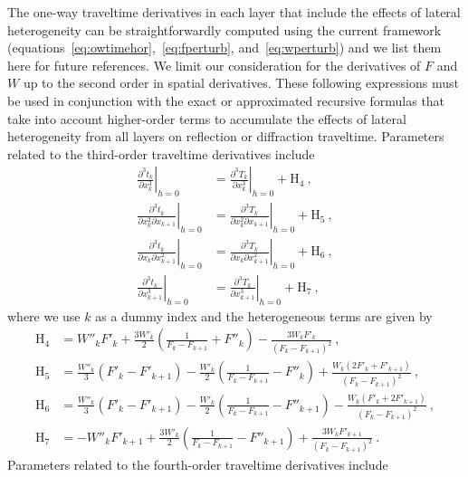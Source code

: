 The one-way traveltime derivatives in each layer that include the effects of lateral heterogeneity can be straightforwardly computed using the current framework (equations~\ref{eq:owtimehor},~\ref{eq:fperturb}, and~\ref{eq:wperturb}) and we list them here for future references. We limit our consideration for the derivatives of $F$ and $W$ up to the second order in spatial derivatives. These following expressions must be used in conjunction with the exact or approximated recursive formulas that take into account higher-order terms to accumulate the effects of lateral heterogeneity from all layers on reflection or diffraction traveltime. Parameters related to the third-order traveltime derivatives include
\begin{align}
\left. \frac{\partial^3 t_k }{\partial x_k^3}\right\rvert_{h=0} & =  \left. \frac{\partial^3 T_k }{\partial x_k^3}\right\rvert_{h=0} + \text{H}_4~,\\
\nonumber
\left. \frac{\partial^3 t_k }{\partial x_k^2 \partial x_{k+1}}\right\rvert_{h=0} & =  \left. \frac{\partial^3 T_k }{\partial x_k^2 \partial x_{k+1}}\right\rvert_{h=0} + \text{H}_5~,\\
\nonumber
\left. \frac{\partial^3 t_k }{\partial x_k \partial x_{k+1}^2}\right\rvert_{h=0} & =  \left. \frac{\partial^3 T_k }{\partial x_k \partial x_{k+1}^2}\right\rvert_{h=0} + \text{H}_6~,\\
\nonumber
\left. \frac{\partial^3 t_k }{\partial x_{k+1}^3}\right\rvert_{h=0} & =  \left. \frac{\partial^3 T_k }{\partial x_{k+1}^3}\right\rvert_{h=0} + \text{H}_7~,
\end{align}
where we use $k$ as a dummy index and the heterogeneous terms are given by
\begin{align}
\text{H}_4 & = W''_kF'_{k} + \frac{3W'_k}{2}\left(\frac{1}{F_k-F_{k+1}} + F''_{k} \right) - \frac{3 W_k F'_{k} }{(F_k-F_{k+1})^2} ~,\\
\nonumber
\text{H}_5 & = \frac{W''_k}{3} (F'_{k}- F'_{k+1}) - \frac{W'_k}{2} \left(\frac{1}{F_k-F_{k+1}} - F''_{k} \right) + \frac{ W_k (2F'_{k}+ F'_{k+1}) }{(F_k-F_{k+1})^2}~,\\
\nonumber
\text{H}_6 & = \frac{W''_k}{3} (F'_{k}- F'_{k+1}) - \frac{W'_k}{2} \left(\frac{1}{F_k-F_{k+1}} - F''_{k+1}\right) - \frac{ W_k (F'_{k}+ 2F'_{k+1}) }{(F_k-F_{k+1})^2}~,\\
\nonumber
\text{H}_7 & =  -W''_kF'_{k+1} + \frac{3W'_k}{2}\left(\frac{1}{F_k-F_{k+1}} - F''_{k+1} \right) + \frac{3 W_k F'_{k+1} }{(F_k-F_{k+1})^2} ~.
\end{align}
Parameters related to the fourth-order traveltime derivatives include
